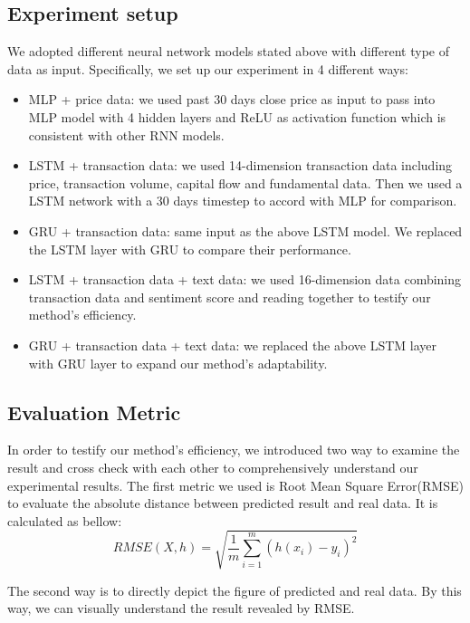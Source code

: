 \documentclass[runningheads]{llncs}
\begin{document}
\subsection{Experiment setup}
We adopted different neural network models stated above with different type of data as input. Specifically, we set up our experiment in 4 different ways:
\begin{itemize}
    \item MLP + price data: we used past 30 days close price as input to pass into MLP model with 4 hidden layers and ReLU as activation function which is consistent with other RNN models.
    \item LSTM + transaction data: we used 14-dimension transaction data including price, transaction volume, capital flow and fundamental data. Then we used a LSTM network with a 30 days timestep to accord with MLP for comparison. 
    \item GRU + transaction data: same input as the above LSTM model. We replaced the LSTM layer with GRU to compare their performance.
    \item LSTM + transaction data + text data: we used 16-dimension data combining transaction data and sentiment score and reading together to testify our method’s efficiency.
    \item GRU + transaction data + text data: we replaced the above LSTM layer with GRU layer to expand our method’s adaptability.
\end{itemize}

\subsection{Evaluation Metric}
In order to testify our method's efficiency, we introduced two way to examine the result and cross check with each other to comprehensively understand our experimental results.
The first metric we used is Root Mean Square Error(RMSE) to evaluate the absolute distance between predicted result and real data. It is calculated as bellow:
\begin{equation}
    RMSE(X,h) = \sqrt{\frac{1}{m}\sum_{i=1}^m(h(x_i)-y_i)^2}
\end{equation}

The second way is to directly depict the figure of predicted and real data. By this way, we can visually understand the result revealed by RMSE.
\end{document}

